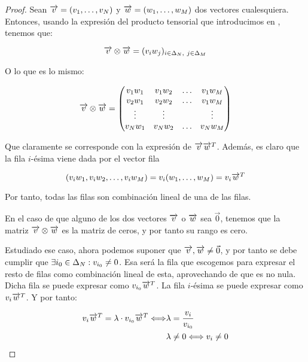 \begin{proof}

	Sean $\overrightarrow{v} = (v_1, \ldots, v_N)$ y $\overrightarrow{w} = (w_1, \ldots, w_M)$ dos vectores cualesquiera. Entonces, usando la expresión del producto tensorial que introducimos en , tenemos que:

	\begin{equation}
		\overrightarrow{v} \otimes \overrightarrow{w} = (v_i w_j)_{i \in \Delta_{N},\ j \in \Delta_{M}}
	\end{equation}

	O lo que es lo mismo:

	\begin{equation}
		\overrightarrow{v} \otimes \overrightarrow{w} = \begin{pmatrix}
			v_1 w_1 & v_1 w_2 & \ldots & v_1 w_M \\
			v_2 w_1 & v_2 w_2 & \ldots & v_1 w_M \\
			\vdots  & \vdots  &        & \vdots  \\
			v_N w_1 & v_N w_2 & \ldots & v_N w_M \\
		\end{pmatrix}
	\end{equation}

	Que claramente se corresponde con la expresión de $\overrightarrow{v} \overrightarrow{w}^T$. Además, es claro que la fila $i$-ésima viene dada por el vector fila

	$$(v_i w_1, v_i w_2, \ldots, v_i w_M) = v_i (w_1, \ldots, w_M) = v_i \overrightarrow{w}^T$$

	Por tanto, todas las filas son combinación lineal de una de las filas.

	En el caso de que alguno de los dos vectores $\overrightarrow{v}$ o $\overrightarrow{w}$ sea $\vec{0}$, tenemos que la matriz $\overrightarrow{v} \otimes \overrightarrow{w}$ es la matriz de ceros, y por tanto su rango es cero.

	Estudiado ese caso, ahora podemos suponer que $\overrightarrow{v}, \overrightarrow{w} \neq \vec{0}$, y por tanto se debe cumplir que $\exists i_0 \in \Delta_{N}: v_{i_0} \neq 0$. Esa será la fila que escogemos para expresar el resto de filas como combinación lineal de esta, aprovechando de que es no nula. Dicha fila se puede expresar como $v_{i_0} \overrightarrow{w}^T$. La fila $i$-ésima se puede expresar como $v_i \overrightarrow{w}^T$. Y por tanto:

	\begin{equation}
		\begin{split}
			v_i \overrightarrow{w}^T = \lambda \cdot v_{i_0} \overrightarrow{w}^T \Longleftrightarrow & \lambda = \frac{v_i}{v_{i_0}} \\
			& \lambda \neq 0 \Longleftrightarrow v_i \neq 0
		\end{split}
	\end{equation}


\end{proof}
